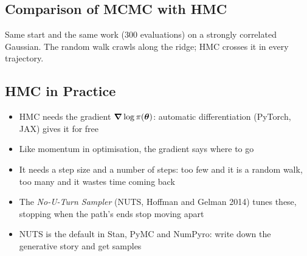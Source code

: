 \begin{slide}
\section[-2]{Comparison of MCMC with HMC}

\pb\pause{}
\begin{center}
  \pause
\end{center}
Same start and the same work (300 evaluations) on a strongly correlated
Gaussian.  The random walk crawls along the ridge; HMC crosses it in
every trajectory.\pauseh

\end{slide}



\begin{slide}
\section{HMC in Practice}

\begin{PauseHighLight}
  \begin{itemize}
  \item HMC needs the gradient $\bm{\nabla}\log\pi(\bm{\theta})$: automatic
    differentiation (PyTorch, JAX) gives it for free\pause
  \item Like momentum in optimisation, the gradient says where to go\pause
  \item It needs a step size and a number of steps: too few and it is a
    random walk, too many and it wastes time coming back\pause
  \item The \emph{No-U-Turn Sampler} (NUTS, Hoffman and Gelman 2014)
    tunes these, stopping when the path's ends stop moving apart\pause
  \item NUTS is the default in Stan, PyMC and NumPyro: write down the
    generative story and get samples\pause
  \end{itemize}
\end{PauseHighLight}

\end{slide}


